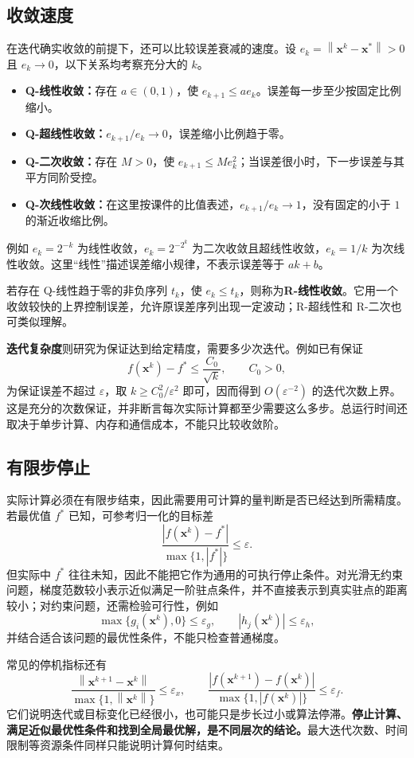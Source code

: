 \documentclass[UTF8,fontset=fandol,a4paper,12pt]{ctexart}
\newcommand{\vx}{\boldsymbol x}
\newcommand{\norm}[1]{\left\lVert#1\right\rVert}
\theoremstyle{definition}
\begin{document}
\subsection{收敛速度}
在迭代确实收敛的前提下，还可以比较误差衰减的速度。设 $e_k=\norm{\vx^k-\vx^*}>0$ 且 $e_k\to0$，以下关系均考察充分大的 $k$。
\begin{itemize}
\item \textbf{Q-线性收敛：}存在 $a\in(0,1)$，使 $e_{k+1}\le a e_k$。误差每一步至少按固定比例缩小。
\item \textbf{Q-超线性收敛：}$e_{k+1}/e_k\to0$，误差缩小比例趋于零。
\item \textbf{Q-二次收敛：}存在 $M>0$，使 $e_{k+1}\le M e_k^2$；当误差很小时，下一步误差与其平方同阶受控。
\item \textbf{Q-次线性收敛：}在这里按课件的比值表述，$e_{k+1}/e_k\to1$，没有固定的小于 $1$ 的渐近收缩比例。
\end{itemize}
例如 $e_k=2^{-k}$ 为线性收敛，$e_k=2^{-2^k}$ 为二次收敛且超线性收敛，$e_k=1/k$ 为次线性收敛。这里“线性”描述误差缩小规律，不表示误差等于 $ak+b$。

若存在 Q-线性趋于零的非负序列 $t_k$，使 $e_k\le t_k$，则称为\textbf{R-线性收敛}。它用一个收敛较快的上界控制误差，允许原误差序列出现一定波动；R-超线性和 R-二次也可类似理解。

\textbf{迭代复杂度}则研究为保证达到给定精度，需要多少次迭代。例如已有保证
\[
 f(\vx^k)-f^*\le\frac{C_0}{\sqrt{k}},\qquad C_0>0,
\]
为保证误差不超过 $\varepsilon$，取 $k\ge C_0^2/\varepsilon^2$ 即可，因而得到 $O(\varepsilon^{-2})$ 的迭代次数上界。这是充分的次数保证，并非断言每次实际计算都至少需要这么多步。总运行时间还取决于单步计算、内存和通信成本，不能只比较收敛阶。

\subsection{有限步停止}
实际计算必须在有限步结束，因此需要用可计算的量判断是否已经达到所需精度。若最优值 $f^*$ 已知，可参考归一化的目标差
\[
 \frac{|f(\vx^k)-f^*|}{\max\{1,|f^*|\}}\le\varepsilon.
\]
但实际中 $f^*$ 往往未知，因此不能把它作为通用的可执行停止条件。对光滑无约束问题，梯度范数较小表示近似满足一阶驻点条件，并不直接表示到真实驻点的距离较小；对约束问题，还需检验可行性，例如
\[
 \max\{g_i(\vx^k),0\}\le\varepsilon_g,\qquad
 |h_j(\vx^k)|\le\varepsilon_h,
\]
并结合适合该问题的最优性条件，不能只检查普通梯度。

常见的停机指标还有
\[
 \frac{\norm{\vx^{k+1}-\vx^k}}{\max\{1,\norm{\vx^k}\}}\le\varepsilon_x,
 \qquad
 \frac{|f(\vx^{k+1})-f(\vx^k)|}{\max\{1,|f(\vx^k)|\}}\le\varepsilon_f.
\]
它们说明迭代或目标变化已经很小，也可能只是步长过小或算法停滞。\textbf{停止计算、满足近似最优性条件和找到全局最优解，是不同层次的结论。}最大迭代次数、时间限制等资源条件同样只能说明计算何时结束。
\end{document}
